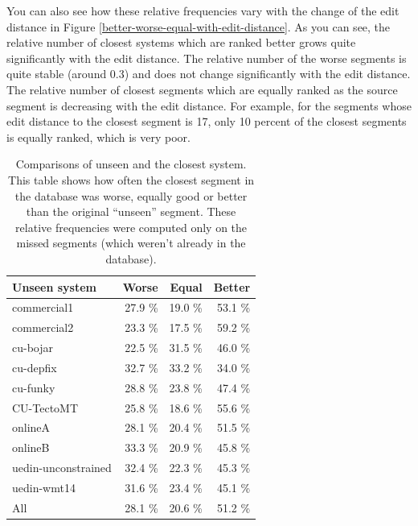 You can also see how these relative frequencies vary with the change of the edit
distance in Figure \ref{better-worse-equal-with-edit-distance}.  As you can
see, the relative number of closest systems which are ranked better grows quite
significantly with the edit distance. The relative number of the worse segments
is quite stable (around 0.3) and does not change significantly with the edit
distance. The relative number of closest segments which are equally ranked as
the source segment is decreasing with the edit distance. For example, for the
segments whose edit distance to the closest segment is 17, only 10 percent of
the closest segments is equally ranked, which is very poor. 


\begin{table}
  \centering
\begin{tabular}{|lrrr|}
  \hline
  \textbf{Unseen system}            &   \textbf{Worse} &   \textbf{Equal} &   \textbf{Better} \\
  \hline
   commercial1         &   27.9 \% &   19.0 \% &    53.1 \% \\
   commercial2         &   23.3 \% &   17.5 \% &    59.2 \% \\
   cu-bojar            &   22.5 \% &   31.5 \% &    46.0 \% \\
   cu-depfix           &   32.7 \% &   33.2 \% &    34.0 \% \\
   cu-funky            &   28.8 \% &   23.8 \% &    47.4 \% \\
   CU-TectoMT          &   25.8 \% &   18.6 \% &    55.6 \% \\
   onlineA             &   28.1 \% &   20.4 \% &    51.5 \% \\
   onlineB             &   33.3 \% &   20.9 \% &    45.8 \% \\
   uedin-unconstrained &   32.4 \% &   22.3 \% &    45.3 \% \\
   uedin-wmt14         &   31.6 \% &   23.4 \% &    45.1 \% \\
  \hline
   All               &   28.1 \% &   20.6 \% &    51.2 \% \\
  \hline
\end{tabular}

\caption[Comparisons of unseen and the closest systems]{Comparisons of unseen
and the closest system. This table shows how often the closest segment in the
database was worse, equally good or better than the original ``unseen''
segment. These relative frequencies were computed only on the missed segments
(which weren't already in the database).}

  \label{edit-distance-matching-analysis}
\end{table}

